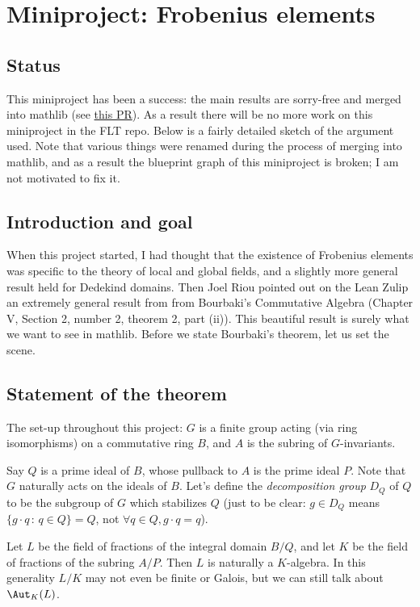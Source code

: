 \chapter{Miniproject: Frobenius elements}\label{Frobenius_project}

\section{Status}

This miniproject has been a success: the main results
are sorry-free and merged into mathlib
(see \href{https://github.com/leanprover-community/mathlib4/pull/19926}{this PR}).
As a result there will be no more work
on this miniproject in the FLT repo. Below is a fairly
detailed sketch of the argument used. Note
that various things were renamed during the process
of merging into mathlib, and as a result the blueprint
graph of this miniproject is broken; I am not motivated
to fix it.

\section{Introduction and goal}

When this project started, I had thought that the existence of Frobenius elements was
specific to the theory of local and global fields, and a slightly more general result
held for Dedekind domains. Then Joel Riou pointed out on the Lean Zulip
an extremely general result from from Bourbaki's Commutative Algebra
(Chapter V, Section 2, number 2, theorem 2, part (ii)). This beautiful
result is surely what we want to see in mathlib. Before we state Bourbaki's
theorem, let us set the scene.

\section{Statement of the theorem}

The set-up throughout this project:
$G$ is a finite group acting (via ring isomorphisms) on a commutative ring $B$,
and $A$ is the subring of $G$-invariants.

Say $Q$ is a prime ideal of $B$, whose pullback to $A$ is the prime ideal $P$.
Note that $G$ naturally acts on the ideals of $B$. Let's define the
\emph{decomposition group} $D_Q$ of $Q$ to be the subgroup of $G$ which
stabilizes $Q$ (just to be clear: $g\in D_Q$ means
$\{g\cdot q\, :\, q \in Q\}=Q$, not $\forall q\in Q, g\cdot q=q$).

Let $L$ be the field of fractions of the integral domain $B/Q$, and let $K$ be the
field of fractions of the subring $A/P$. Then $L$ is naturally a $K$-algebra.
In this generality $L/K$ may not even be finite or Galois, but we can still talk about
$\Aut_K(L)$.

